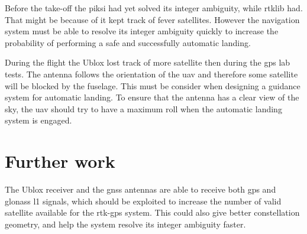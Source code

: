 Before the take-off the piksi had yet solved its integer ambiguity, while \gls{rtklib} had. That might be because of it kept track of fever satellites. However the navigation system must be able to resolve its integer ambiguity quickly to increase the probability of performing a safe and successfully automatic landing.

During the flight the Ublox lost track of more satellite then during the \gls{gps} lab tests. The antenna follows the orientation of the \gls{uav} and therefore some satellite will be blocked by the fuselage. This must be consider when designing a guidance system for automatic landing. To ensure that the antenna has a clear view of the sky, the \gls{uav} should try to have a maximum roll when the automatic landing system is engaged.
%
%
%
%
%
%
%
%
%
%
%
%
%
%
%
%
%


\section{Further work}
The Ublox receiver and the \gls{gnss} antennas are able to receive both \gls{gps} and \gls{glonass} \gls{l1} signals, which should be exploited to increase the number of valid satellite available for the \gls{rtk-gps} system. This could also give better constellation geometry, and help the system resolve its integer ambiguity faster.

